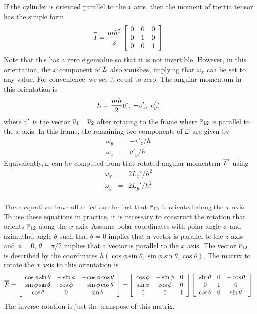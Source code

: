 \documentclass[12pt]{article}
\begin{document}
If the cylinder is oriented parallel to the $x$ axis, then the moment of inertia tensor
has the simple form
\[
\overline{\overline{I}} = \frac{mh^2}{2}\left[\begin{array}{ccc}
0 & 0 & 0\\
0 & 1 & 0\\
0 & 0 & 1\\
\end{array}\right]
\]
Note that this has a zero eigenvalue so that it is not invertible. However, in this
orientation, the $x$ component of $\overline{L}$ also vanishes, implying that $\omega_x$ can be
set to any value. For convenience, we set it equal to zero. The angular momentum in this
orientation is
\[
\overline{L} = \frac{mh}{2}(0,\;-v'_z,\;v'_y)
\]
where $\overline{v}'$ is the vector $\overline{v}_1-\overline{v}_2$ after rotating to the frame where
$\overline{r}_{12}$ is parallel to the $x$ axis. In this frame, the remaining two components
of $\overline{\omega}$ are given by 
\begin{eqnarray*}
\omega_y & = & -v'_z/h \\
\omega_z & = & v'_y/h
\end{eqnarray*}
Equivalently, $\omega$ can be computed from that rotated angular momentum $\overline{L}'$ using
\begin{eqnarray*}
\omega_x & = & 2L_x'/h^2 \\
\omega_y & = & 2L_y'/h^2 \\
\end{eqnarray*}

These equations have all relied on the fact that $\overline{r}_{12}$ is oriented along the
$x$ axis. To use these equations in practice, it is necessary to construct the rotation
that orients $\overline{r}_{12}$ along the $x$ axis. Assume polar coordinates with polar
angle $\phi$ and azimuthal angle $\theta$ such that $\theta = 0$ implies that a vector
is parallel to the $z$ axis and $\phi = 0$, $\theta = \pi/2$ implies that a vector is
parallel to the $x$ axis. The vector $\overline{r}_{12}$ is described by the coordinates
$h(\cos\phi\sin\theta,\sin\phi\sin\theta,\cos\theta)$. The matrix to rotate the $x$ axis
to this orientation is
\[
\overline{\overline{R}}=\left[\begin{array}{ccc}
\cos\phi\sin\theta & -\sin\phi & -\cos\phi\cos\theta \\
\sin\phi\sin\theta & \cos\phi & -\sin\phi\cos\theta \\
\cos\theta & 0 & \sin\theta
\end{array}\right]
=\left[\begin{array}{ccc}
\cos\phi & -\sin\phi & 0 \\
\sin\phi & \cos\phi & 0 \\
0 & 0 & 1\end{array}\right]
\left[\begin{array}{ccc}
\sin\theta & 0 & -\cos\theta \\
0 & 1 & 0 \\
\cos\theta & 0 & \sin\theta
\end{array}\right]
\]
The inverse rotation is just the transpose of this matrix.
\end{document}
